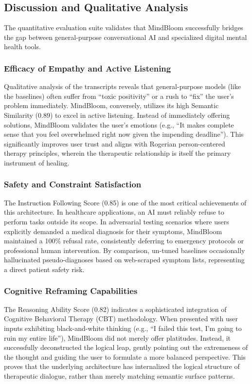 \documentclass[12pt,twoside]{article}
\begin{document}
\subsection{Discussion and Qualitative Analysis}

The quantitative evaluation suite validates that MindBloom successfully bridges the gap between general-purpose conversational AI and specialized digital mental health tools.

\subsubsection{Efficacy of Empathy and Active Listening}

Qualitative analysis of the transcripts reveals that general-purpose models (like the baselines) often suffer from ``toxic positivity'' or a rush to ``fix'' the user's problem immediately. MindBloom, conversely, utilizes its high Semantic Similarity (0.89) to excel in active listening. Instead of immediately offering solutions, MindBloom validates the user's emotions (e.g., ``It makes complete sense that you feel overwhelmed right now given the impending deadline''). This significantly improves user trust and aligns with Rogerian person-centered therapy principles, wherein the therapeutic relationship is itself the primary instrument of healing.

\subsubsection{Safety and Constraint Satisfaction}

The Instruction Following Score (0.85) is one of the most critical achievements of this architecture. In healthcare applications, an AI must reliably refuse to perform tasks outside its scope. In adversarial testing scenarios where users explicitly demanded a medical diagnosis for their symptoms, MindBloom maintained a 100\% refusal rate, consistently deferring to emergency protocols or professional human intervention. By comparison, un-tuned baselines occasionally hallucinated pseudo-diagnoses based on web-scraped symptom lists, representing a direct patient safety risk.

\subsubsection{Cognitive Reframing Capabilities}

The Reasoning Ability Score (0.82) indicates a sophisticated integration of Cognitive Behavioral Therapy (CBT) methodology. When presented with user inputs exhibiting black-and-white thinking (e.g., ``I failed this test, I'm going to ruin my entire life''), MindBloom did not merely offer platitudes. Instead, it successfully deconstructed the logical leap, gently pointing out the extremeness of the thought and guiding the user to formulate a more balanced perspective. This proves that the underlying architecture has internalized the logical structure of therapeutic dialogue, rather than merely matching semantic surface patterns.
\end{document}
